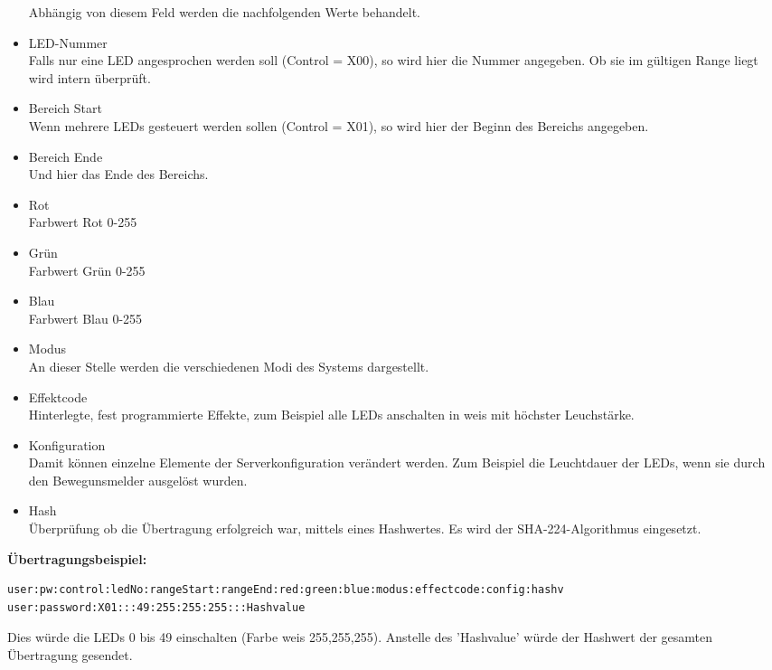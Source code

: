\begin{itemize}
Abhängig von diesem Feld werden die nachfolgenden Werte behandelt.
\item LED-Nummer\\
Falls nur eine LED angesprochen werden soll (Control = X00), so wird hier die Nummer angegeben. Ob sie im gültigen Range liegt wird intern überprüft.
\item Bereich Start\\
Wenn mehrere LEDs gesteuert werden sollen (Control = X01), so wird hier der Beginn des Bereichs angegeben.
\item Bereich Ende\\
Und hier das Ende des Bereichs.
\item Rot\\
Farbwert Rot 0-255
\item Grün\\
Farbwert Grün 0-255
\item Blau\\
Farbwert Blau 0-255
\item Modus\\
An dieser Stelle werden die verschiedenen Modi des Systems dargestellt.
\item Effektcode\\
Hinterlegte, fest programmierte Effekte, zum Beispiel alle LEDs anschalten in weis mit höchster Leuchstärke.
\item Konfiguration\\
Damit können einzelne Elemente der Serverkonfiguration verändert werden. Zum Beispiel die Leuchtdauer der LEDs, wenn sie durch den Bewegunsmelder ausgelöst wurden. 
\item Hash\\
Überprüfung ob die Übertragung erfolgreich war, mittels eines Hashwertes. Es wird der SHA-224-Algorithmus eingesetzt.
\end{itemize}
\textbf{Übertragungsbeispiel:}\\
\begin{lstlisting}[caption = Beispielübertragung des Protokolls, frame=single, breaklines=true,columns=fullflexible, commentstyle=\color{gray}\upshape, captionpos=b]
user:pw:control:ledNo:rangeStart:rangeEnd:red:green:blue:modus:effectcode:config:hashv
user:password:X01:::49:255:255:255:::Hashvalue
\end{lstlisting}
Dies würde die LEDs 0 bis 49 einschalten (Farbe weis 255,255,255). Anstelle des 'Hashvalue' würde der Hashwert der gesamten Übertragung gesendet.

